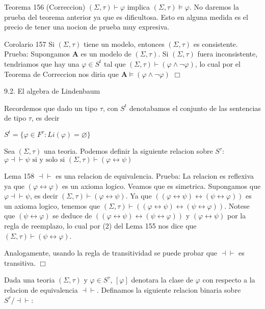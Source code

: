 Teorema 156 (Correccion) \((\Sigma ,\tau )\vdash \varphi \) implica \((\Sigma ,\tau )\models \varphi .\)
No daremos la prueba del teorema anterior ya que es dificultosa. Esto en alguna medida es el precio de tener una nocion de prueba muy expresiva.

Corolario 157 Si \((\Sigma ,\tau )\) tiene un modelo, entonces \((\Sigma ,\tau )\) es consistente.
Prueba: Supongamos \(\mathbf{A}\) es un modelo de \((\Sigma ,\tau ).\) Si \((\Sigma ,\tau )\) fuera inconsistente, tendriamos que hay una \(\varphi \in S^{t}\) tal que \( (\Sigma ,\tau )\vdash (\varphi \wedge \lnot \varphi )\), lo cual por el Teorema de Correccion nos diria que \(\mathbf{A}\models (\varphi \wedge \lnot \varphi )\) \(\Box\)

9.2. El algebra de Lindenbaum

Recordemos que dado un tipo \(\tau \), con \(S^{t}\) denotabamos el conjunto de las sentencias de tipo \(\tau \), es decir

\(\displaystyle S^{t}=\{\varphi \in F^{\tau }:Li(\varphi )=\varnothing \} \)

Sea \((\Sigma ,\tau )\) una teoria. Podemos definir la siguiente relacion sobre \(S^{\tau }\):
\(\displaystyle \varphi \dashv \vdash \psi \text{ si y solo si }(\Sigma ,\tau )\vdash \left( \varphi \leftrightarrow \psi \right) \)

Lema 158 \(\dashv \vdash \) es una relacion de equivalencia.
Prueba: La relacion es reflexiva ya que \((\varphi \leftrightarrow \varphi )\) es un axioma logico. Veamos que es simetrica. Supongamos que \(\varphi \dashv \vdash \psi \), es decir \((\Sigma ,\tau )\vdash \left( \varphi \leftrightarrow \psi \right) \). Ya que \(((\varphi \leftrightarrow \psi )\leftrightarrow (\psi \leftrightarrow \varphi ))\) es un axioma logico, tenemos que \((\Sigma ,\tau )\vdash ((\varphi \leftrightarrow \psi )\leftrightarrow (\psi \leftrightarrow \varphi ))\). Notese que \(\left( \psi \leftrightarrow \varphi \right) \) se deduce de \(((\varphi \leftrightarrow \psi )\leftrightarrow (\psi \leftrightarrow \varphi ))\) y \((\varphi \leftrightarrow \psi )\) por la regla de reemplazo, lo cual por (2) del Lema 155 nos dice que \((\Sigma ,\tau )\vdash \left( \psi \leftrightarrow \varphi \right) \).

Analogamente, usando la regla de transitividad se puede probar que \(\dashv \vdash \) es transitiva. \(\Box\)

Dada una teoria \((\Sigma ,\tau )\) y \(\varphi \in S^{\tau }\), \([\varphi ]\) denotara la clase de \(\varphi \) con respecto a la relacion de equivalencia \( \dashv \vdash \). Definamos la siguiente relacion binaria sobre \(S^{\tau }/ \mathrm{\dashv \vdash }\):

